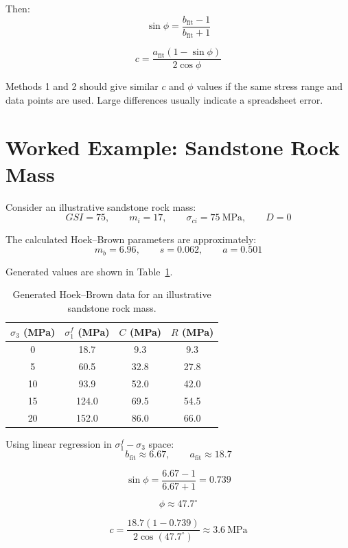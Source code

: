 Then:
\[
\sin\phi=
\frac{b_{\mathrm{fit}}-1}
{b_{\mathrm{fit}}+1}
\]

\[
c=
\frac{a_{\mathrm{fit}}(1-\sin\phi)}
{2\cos\phi}
\]

\begin{notebox}
Methods 1 and 2 should give similar \(c\) and \(\phi\) values if the same stress range
and data points are used. Large differences usually indicate a spreadsheet error.
\end{notebox}

\section{Worked Example: Sandstone Rock Mass}
\label{sec:ch04-worked-example}

Consider an illustrative sandstone rock mass:
\[
GSI=75,\qquad m_i=17,\qquad \sigma_{ci}=75~\text{MPa},\qquad D=0
\]

The calculated Hoek--Brown parameters are approximately:
\[
m_b=6.96,\qquad s=0.062,\qquad a=0.501
\]

Generated values are shown in Table~\ref{tab:example}.

\begin{table}[H]
\centering
\small
\begin{tabular}{c c c c}
\toprule
\(\sigma_3\) (MPa) & \(\sigma_1^f\) (MPa) & \(C\) (MPa) & \(R\) (MPa) \\
\midrule
0 & 18.7 & 9.3 & 9.3 \\
5 & 60.5 & 32.8 & 27.8 \\
10 & 93.9 & 52.0 & 42.0 \\
15 & 124.0 & 69.5 & 54.5 \\
20 & 152.0 & 86.0 & 66.0 \\
\bottomrule
\end{tabular}
\caption{Generated Hoek--Brown data for an illustrative sandstone rock mass.}
\label{tab:example}
\end{table}

Using linear regression in \(\sigma_1^f-\sigma_3\) space:
\[
b_{\mathrm{fit}}\approx 6.67,
\qquad
a_{\mathrm{fit}}\approx 18.7
\]

\[
\sin\phi=
\frac{6.67-1}{6.67+1}
=
0.739
\]

\[
\phi\approx47.7^\circ
\]

\[
c=
\frac{18.7(1-0.739)}
{2\cos(47.7^\circ)}
\approx
3.6~\text{MPa}
\]


